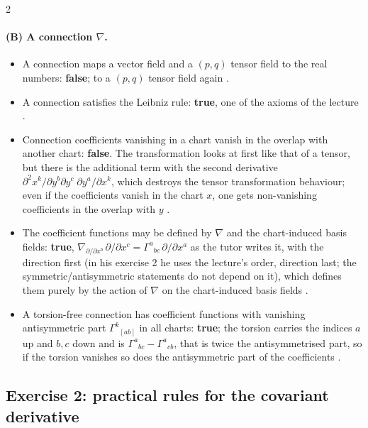 \begin{paracol}{2}
\paragraph{(B) A connection $\nabla$.}
\begin{itemize}
  \item A connection maps a vector field and a $(p,q)$ tensor field to the real numbers: \textbf{false}; to a $(p,q)$ tensor field again .
  \item A connection satisfies the Leibniz rule: \textbf{true}, one of the axioms of the lecture .
  \item Connection coefficients vanishing in a chart vanish in the overlap with another chart: \textbf{false}. The transformation looks at first like that of a tensor, but there is the additional term with the second derivative $\partial^2x^k/\partial y^b\partial y^c\;\partial y^a/\partial x^k$, which destroys the tensor transformation behaviour; even if the coefficients vanish in the chart $x$, one gets non-vanishing coefficients in the overlap with $y$ .
  \item The coefficient functions may be defined by $\nabla$ and the chart-induced basis fields: \textbf{true}, $\nabla_{\partial/\partial x^b}\,\partial/\partial x^c=\Gamma^a{}_{bc}\,\partial/\partial x^a$ as the tutor writes it, with the direction first (in his exercise 2 he uses the lecture's order, direction last; the symmetric/antisymmetric statements do not depend on it), which defines them purely by the action of $\nabla$ on the chart-induced basis fields .
  \item A torsion-free connection has coefficient functions with vanishing antisymmetric part $\Gamma^k{}_{[ab]}$ in all charts: \textbf{true}; the torsion carries the indices $a$ up and $b,c$ down and is $\Gamma^a{}_{bc}-\Gamma^a{}_{cb}$, that is twice the antisymmetrised part, so if the torsion vanishes so does the antisymmetric part of the coefficients .
\end{itemize}

\subsection*{Exercise 2: practical rules for the covariant derivative}


\end{paracol}
